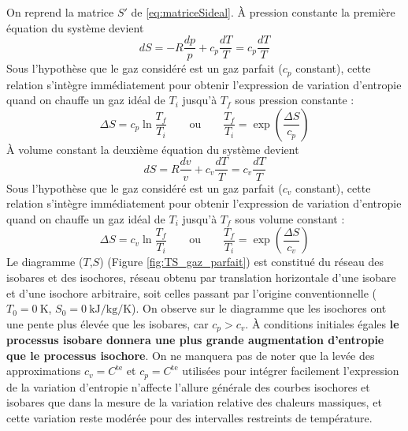 \iffalse
	On reprend la matrice $S'$ de \ref{eq:matriceSideal}. À pression constante la première équation du système devient 
	\begin{equation} dS = -R\frac{dp}{p} + c_p\frac{dT}{T} = c_p\frac{dT}{T} \end{equation}
	Sous l'hypothèse que le gaz considéré est un gaz parfait ($c_p$ constant), cette relation s'intègre immédiatement pour obtenir l'expression de variation d'entropie quand on chauffe un gaz idéal de $T_i$ jusqu'à $T_f$ sous pression constante :
	\begin{equation} \Delta S = c_p\ln{\frac{T_f}{T_i}} \qquad \text{ou} \qquad \frac{T_f}{T_i} = \exp\left(\frac{\Delta S}{c_p}\right) \label{eq:isobare_ideal}\end{equation}
	À volume constant la deuxième équation du système devient
	\begin{equation} dS = R\frac{dv}{v} + c_v\frac{dT}{T} = c_v\frac{dT}{T} \end{equation}
	Sous l'hypothèse que le gaz considéré est un gaz parfait ($c_v$ constant), cette relation s'intègre immédiatement pour obtenir l'expression de variation d'entropie quand on chauffe un gaz idéal de $T_i$ jusqu'à $T_f$ sous volume constant :
	\begin{equation} \Delta S = c_v\ln{\frac{T_f}{T_i}} \qquad \text{ou} \qquad \frac{T_f}{T_i} = \exp\left(\frac{\Delta S}{c_v}\right) \label{eq:isochore_ideal}\end{equation}
	Le diagramme ($T$,$S$) (Figure \ref{fig:TS_gaz_parfait}) est constitué du réseau des isobares et des isochores, réseau obtenu par translation horizontale d'une isobare et d'une isochore arbitraire, soit celles passant par l'origine conventionnelle ($T_0 = \SI{0}{\kelvin}$, $S_0 = \SI{0}{\kilo\joule\per\kilo\gram\per\kelvin}$). On observe sur le diagramme que les isochores ont une pente plus élevée que les isobares, car $c_p > c_v$. À conditions initiales égales \textbf{le processus isobare donnera une plus grande augmentation d'entropie que le processus isochore}. 
	On ne manquera pas de noter que la levée des approximations $c_v = C^\text{te}$ et $c_p = C^\text{te}$ utilisées pour intégrer facilement l'expression de la variation d'entropie n'affecte l'allure générale des courbes isochores et isobares que dans la mesure de la variation relative des chaleurs massiques, et cette variation reste modérée pour des intervalles restreints de température.
